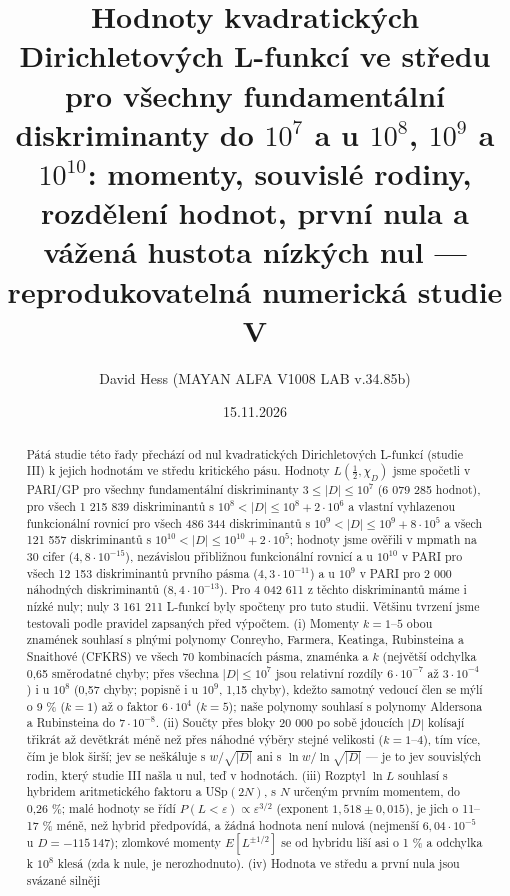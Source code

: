 \documentclass[
  10pt,
]{article}
\title{Hodnoty kvadratických Dirichletových L-funkcí ve středu pro
všechny fundamentální diskriminanty do \(10^7\) a u \(10^8\), \(10^9\) a
\(10^{10}\): momenty, souvislé rodiny, rozdělení hodnot, první nula a
vážená hustota nízkých nul --- reprodukovatelná numerická studie V}
\author{David Hess (MAYAN ALFA V1008 LAB v.34.85b)}
\date{15.11.2026}
\begin{document}
\maketitle
\begin{abstract}
Pátá studie této řady přechází od nul kvadratických Dirichletových
L-funkcí (studie III) k jejich hodnotám ve středu kritického pásu.
Hodnoty \(L(\tfrac12, \chi_D)\) jsme spočetli v PARI/GP pro všechny
fundamentální diskriminanty \(3 \le |D| \le 10^7\) (6 079 285 hodnot),
pro všech 1 215 839 diskriminantů s \(10^8 < |D| \le 10^8 + 2\cdot10^6\)
a vlastní vyhlazenou funkcionální rovnicí pro všech 486 344
diskriminantů s \(10^9 < |D| \le 10^9 + 8\cdot10^5\) a všech 121 557
diskriminantů s \(10^{10} < |D| \le 10^{10} + 2\cdot10^5\); hodnoty jsme
ověřili v mpmath na 30 cifer (\(4{,}8\cdot10^{-15}\)), nezávislou
přibližnou funkcionální rovnicí a u \(10^{10}\) v PARI pro všech 12 153
diskriminantů prvního pásma (\(4{,}3\cdot10^{-11}\)) a u \(10^9\) v PARI
pro 2 000 náhodných diskriminantů (\(8{,}4\cdot10^{-13}\)). Pro 4 042
611 z těchto diskriminantů máme i nízké nuly; nuly 3 161 211 L-funkcí
byly spočteny pro tuto studii. Většinu tvrzení jsme testovali podle
pravidel zapsaných před výpočtem. (i) Momenty \(k = 1\)--\(5\) obou
znamének souhlasí s plnými polynomy Conreyho, Farmera, Keatinga,
Rubinsteina a Snaithové (CFKRS) ve všech 70 kombinacích pásma, znaménka
a \(k\) (největší odchylka 0,65 směrodatné chyby; přes všechna
\(|D| \le 10^7\) jsou relativní rozdíly \(6\cdot10^{-7}\) až
\(3\cdot10^{-4}\)) i u \(10^8\) (0,57 chyby; popisně i u \(10^9\), 1,15
chyby), kdežto samotný vedoucí člen se mýlí o 9 \% (\(k = 1\)) až o
faktor \(6\cdot10^4\) (\(k = 5\)); naše polynomy souhlasí s polynomy
Aldersona a Rubinsteina do \(7\cdot10^{-8}\). (ii) Součty přes bloky 20
000 po sobě jdoucích \(|D|\) kolísají třikrát až devětkrát méně než přes
náhodné výběry stejné velikosti (\(k = 1\)--4), tím více, čím je blok
širší; jev se neškáluje s \(w/\sqrt{|D|}\) ani s \(\ln w/\ln\sqrt{|D|}\)
--- je to jev souvislých rodin, který studie III našla u nul, teď v
hodnotách. (iii) Rozptyl \(\ln L\) souhlasí s hybridem aritmetického
faktoru a USp\((2N)\), s \(N\) určeným prvním momentem, do 0,26 \%; malé
hodnoty se řídí \(P(L < \varepsilon) \propto \varepsilon^{3/2}\)
(exponent \(1{,}518 \pm 0{,}015\)), je jich o 11--17 \% méně, než hybrid
předpovídá, a žádná hodnota není nulová (nejmenší \(6{,}04\cdot10^{-5}\)
u \(D = -115\,147\)); zlomkové momenty \(E[L^{\pm 1/2}]\) se od hybridu
liší asi o 1 \% a odchylka k \(10^8\) klesá (zda k nule, je
nerozhodnuto). (iv) Hodnota ve středu a první nula jsou svázané silněji

\end{abstract}
\end{document}
